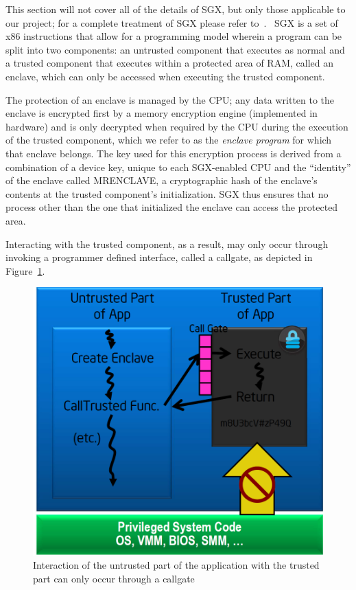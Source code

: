 \documentclass[../main.tex]{subfiles}
\begin{document}
This section will not cover all of the details of SGX, but only those
applicable to our project; for a complete treatment of SGX please
refer to~\cite{IntelCorporation2010}. \Intel~SGX is a set of x86
instructions that allow for a programming model wherein a program can
be split into two components: an untrusted component that executes as
normal and a trusted component that executes within a protected area
of RAM, called an enclave, which can only be accessed when executing
the trusted component.

The protection of an enclave is managed by the CPU; any data written
to the enclave is encrypted first by a memory encryption engine
(implemented in hardware) and is only decrypted when required by the
CPU during the execution of the trusted component, which we refer to
as the \textit{enclave program} for which that enclave belongs. The
key used for this encryption process is derived from a combination of
a device key, unique to each SGX-enabled CPU and the ``identity'' of
the enclave called MRENCLAVE, a cryptographic hash of the enclave's
contents at the trusted component's initialization. SGX thus ensures
that no process other than the one that initialized the enclave can
access the protected area.

Interacting with the trusted component, as a result, may only occur
through invoking a programmer defined interface, called a callgate, as
depicted in Figure~\ref{fig:sgxhighlevel}.

\begin{figure}[H]
  \centering
  \includegraphics[scale=0.25]{images/sgxhighlevel.png}
  \caption{Interaction of the untrusted part of the application with
    the trusted part can only occur through a callgate}
  \label{fig:sgxhighlevel}
\end{figure}
\end{document}
